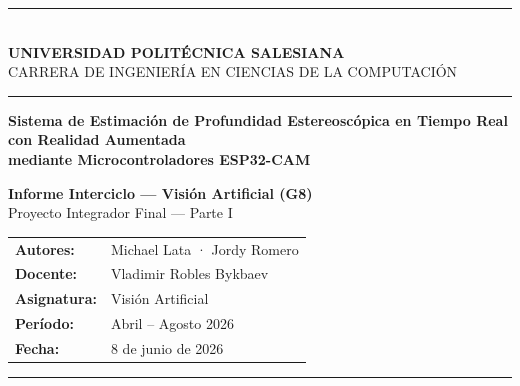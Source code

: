 \documentclass[12pt, a4paper]{article}
\begin{document}
\begin{titlepage}
\centering
\vspace*{0.8cm}
{\color{salesiana}\rule{\linewidth}{2pt}}\\[0.35cm]
{\Large\bfseries UNIVERSIDAD POLITÉCNICA SALESIANA}\\[0.15cm]
{\normalsize CARRERA DE INGENIERÍA EN CIENCIAS DE LA COMPUTACIÓN}\\[0.2cm]
{\color{salesiana}\rule{\linewidth}{1pt}}

\vspace{2.2cm}

\parbox{0.80\textwidth}{\centering\LARGE\bfseries\color{salesiana}
  Sistema de Estimación de Profundidad Estereoscópica
  en Tiempo Real con Realidad Aumentada\\[0.3cm]
  \large mediante Microcontroladores ESP32-CAM
}

\vspace{1.4cm}

{\large\bfseries Informe Interciclo — Visión Artificial (G8)}\\[0.2cm]
{\normalsize Proyecto Integrador Final — Parte I}

\vspace{1.6cm}

\begin{tabular}{@{}ll@{}}
\textbf{Autores:}    & Michael Lata · Jordy Romero \\[0.25cm]
\textbf{Docente:}    & Vladimir Robles Bykbaev \\[0.25cm]
\textbf{Asignatura:} & Visión Artificial \\[0.25cm]
\textbf{Período:}    & Abril -- Agosto 2026 \\[0.25cm]
\textbf{Fecha:}      & 8 de junio de 2026 \\
\end{tabular}

\vfill
{\color{salesiana}\rule{\linewidth}{2pt}}
\end{titlepage}
\end{document}
